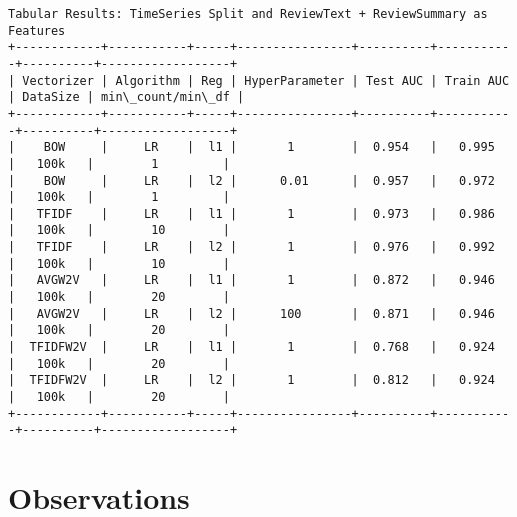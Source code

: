 \documentclass[11pt]{article}
\begin{document}
    \begin{Verbatim}[commandchars=\\\{\}]






Tabular Results: TimeSeries Split and ReviewText + ReviewSummary as Features
+------------+-----------+-----+----------------+----------+-----------+----------+------------------+
| Vectorizer | Algorithm | Reg | HyperParameter | Test AUC | Train AUC | DataSize | min\_count/min\_df |
+------------+-----------+-----+----------------+----------+-----------+----------+------------------+
|    BOW     |     LR    |  l1 |       1        |  0.954   |   0.995   |   100k   |        1         |
|    BOW     |     LR    |  l2 |      0.01      |  0.957   |   0.972   |   100k   |        1         |
|   TFIDF    |     LR    |  l1 |       1        |  0.973   |   0.986   |   100k   |        10        |
|   TFIDF    |     LR    |  l2 |       1        |  0.976   |   0.992   |   100k   |        10        |
|   AVGW2V   |     LR    |  l1 |       1        |  0.872   |   0.946   |   100k   |        20        |
|   AVGW2V   |     LR    |  l2 |      100       |  0.871   |   0.946   |   100k   |        20        |
|  TFIDFW2V  |     LR    |  l1 |       1        |  0.768   |   0.924   |   100k   |        20        |
|  TFIDFW2V  |     LR    |  l2 |       1        |  0.812   |   0.924   |   100k   |        20        |
+------------+-----------+-----+----------------+----------+-----------+----------+------------------+

    \end{Verbatim}

    \section{Observations}\label{observations}
\end{document}
